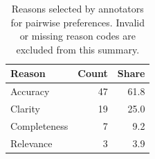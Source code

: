 \begin{table}[t]
\centering
\small
\begin{tabular}{lrr}
\toprule
Reason & Count & Share \\
\midrule
Accuracy & 47 & 61.8 \\
Clarity & 19 & 25.0 \\
Completeness & 7 & 9.2 \\
Relevance & 3 & 3.9 \\
\bottomrule
\end{tabular}
\caption{Reasons selected by annotators for pairwise preferences. Invalid or missing reason codes are excluded from this summary.}
\label{tab:human_pairwise_reasons}
\end{table}
